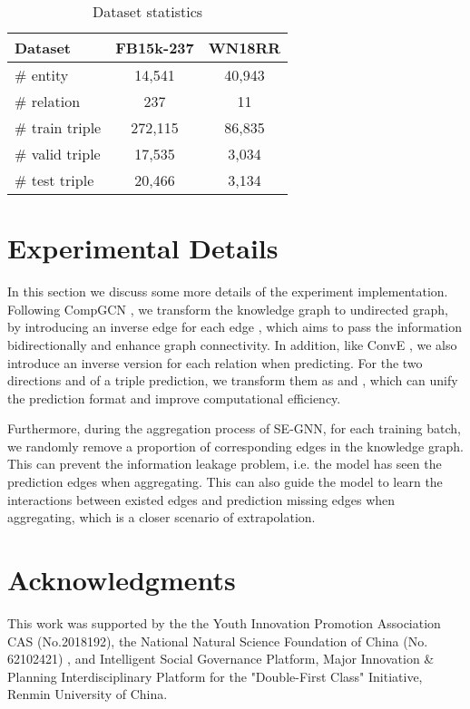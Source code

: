 \documentclass[letterpaper]{article} \usepackage{aaai22}  \usepackage{times}  \usepackage{helvet}  \usepackage{courier}  \usepackage[hyphens]{url}  \usepackage{graphicx} \urlstyle{rm} \def\UrlFont{\rm}  \usepackage{natbib}  \usepackage{caption} \DeclareCaptionStyle{ruled}{labelfont=normalfont,labelsep=colon,strut=off} \frenchspacing  \setlength{\pdfpagewidth}{8.5in}  \setlength{\pdfpageheight}{11in}  \usepackage{algorithm}
\begin{document}
\begin{table}[h]
    \centering
    \begin{tabular}{lcc}
      \toprule
      \textbf{Dataset} & \textbf{FB15k-237} & \textbf{WN18RR}\\
      \hline\hline
      \# entity          & 14,541     & 40,943  \\
      \# relation        & 237        & 11      \\ 
      \# train triple    & 272,115    & 86,835  \\
      \# valid triple    & 17,535     & 3,034   \\ 
      \# test triple     & 20,466     & 3,134   \\
      \bottomrule
    \end{tabular}
    \caption{Dataset statistics}
    \label{tab: dataset}
\end{table}

\section{Experimental Details}
\label{ap: experiment config}
In this section we discuss some more details of the experiment implementation. Following CompGCN \cite{ICLR_2020_Vashishth_CompGCN}, we transform the knowledge graph to undirected graph, by introducing an inverse edge  for each edge , which aims to pass the information bidirectionally and enhance graph connectivity. In addition, like ConvE \cite{AAAI_2018_Dettmers_ConvE_WN18RR}, we also introduce an inverse version for each relation when predicting. For the two directions  and  of a triple prediction, we transform them as  and  , which can unify the prediction format and improve computational efficiency.

Furthermore, during the aggregation process of SE-GNN, for each training batch, we randomly remove a proportion of corresponding edges in the knowledge graph. This can prevent the information leakage problem, i.e. the model has seen the prediction edges when aggregating. This can also guide the model to learn the interactions between existed edges and prediction missing edges when aggregating, which is a closer scenario of extrapolation.

\clearpage

\section*{Acknowledgments}
This work was supported by the the Youth Innovation Promotion Association CAS (No.2018192), the National Natural Science Foundation of China (No. 62102421) , and Intelligent Social Governance Platform, Major Innovation \& Planning Interdisciplinary Platform for the "Double-First Class" Initiative, Renmin University of China. 


\end{document}
